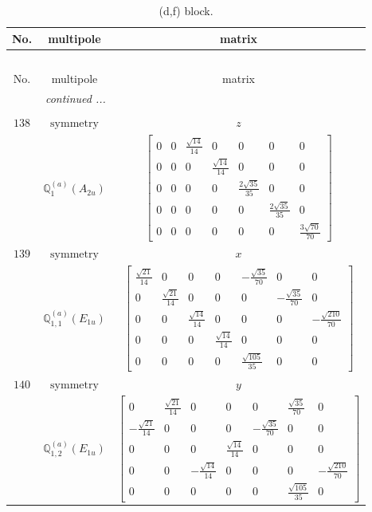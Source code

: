 \documentclass[fleqn,8pt,landscape]{jsarticle}
\begin{document}
\begin{longtable}{ccc}
\caption{(d,f) block.}
 \\
 \hline \hline
No. & multipole & matrix \\ \hline \endfirsthead

\multicolumn{2}{l}{\tablename\ \thetable{}} \\
 \hline \hline
No. & multipole & matrix \\ \hline \endhead

 \hline \hline
\multicolumn{2}{r}{\footnotesize\it continued ...} \\ \endfoot

 \hline \hline
\multicolumn{2}{r}{} \\ \endlastfoot

$ 138 $ & $ \text{symmetry} $ & $ z $ \\
$  $ & $ \mathbb{Q}_{1}^{(a)}(A_{2u}) $ & $ \begin{bmatrix} 0 & 0 & \frac{\sqrt{14}}{14} & 0 & 0 & 0 & 0 \\ 0 & 0 & 0 & \frac{\sqrt{14}}{14} & 0 & 0 & 0 \\ 0 & 0 & 0 & 0 & \frac{2 \sqrt{35}}{35} & 0 & 0 \\ 0 & 0 & 0 & 0 & 0 & \frac{2 \sqrt{35}}{35} & 0 \\ 0 & 0 & 0 & 0 & 0 & 0 & \frac{3 \sqrt{70}}{70} \end{bmatrix} $ \\ \hline
$ 139 $ & $ \text{symmetry} $ & $ x $ \\
$  $ & $ \mathbb{Q}_{1,1}^{(a)}(E_{1u}) $ & $ \begin{bmatrix} \frac{\sqrt{21}}{14} & 0 & 0 & 0 & - \frac{\sqrt{35}}{70} & 0 & 0 \\ 0 & \frac{\sqrt{21}}{14} & 0 & 0 & 0 & - \frac{\sqrt{35}}{70} & 0 \\ 0 & 0 & \frac{\sqrt{14}}{14} & 0 & 0 & 0 & - \frac{\sqrt{210}}{70} \\ 0 & 0 & 0 & \frac{\sqrt{14}}{14} & 0 & 0 & 0 \\ 0 & 0 & 0 & 0 & \frac{\sqrt{105}}{35} & 0 & 0 \end{bmatrix} $ \\ \hline
$ 140 $ & $ \text{symmetry} $ & $ y $ \\
$  $ & $ \mathbb{Q}_{1,2}^{(a)}(E_{1u}) $ & $ \begin{bmatrix} 0 & \frac{\sqrt{21}}{14} & 0 & 0 & 0 & \frac{\sqrt{35}}{70} & 0 \\ - \frac{\sqrt{21}}{14} & 0 & 0 & 0 & - \frac{\sqrt{35}}{70} & 0 & 0 \\ 0 & 0 & 0 & \frac{\sqrt{14}}{14} & 0 & 0 & 0 \\ 0 & 0 & - \frac{\sqrt{14}}{14} & 0 & 0 & 0 & - \frac{\sqrt{210}}{70} \\ 0 & 0 & 0 & 0 & 0 & \frac{\sqrt{105}}{35} & 0 \end{bmatrix} $ \\ \hline

\end{longtable}
\end{document}
